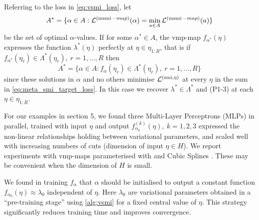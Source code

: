 Referring to the loss in \cref{eq:vsmi_loss}, let
\[
  A^*=\{\alpha\in A: \mathcal{L}^{(\operatorname{\text{msmi}}-map)}(\alpha)=\min_{a\in A} \mathcal{L}^{(\operatorname{\text{msmi}}-map)}(a)\}
\]
be the set of optimal $\alpha$-values.
If for some $\alpha^*\in A$, the \acrshort*{vmp}-map $f_{\alpha^*}(\eta)$ expresses the function $\lambda^*(\eta)$ perfectly at $\eta\in\eta_{1:R}$, that is if $f_{\alpha^*}(\eta_r)\in \Lambda^*(\eta_r),\ r=1,...,R$ then
\[
  A^*=\{\alpha\in A: f_{\alpha}(\eta_r)\in \Lambda^*(\eta_r),\ r=1,...,R\}
\]
since these solutions in $\alpha$ and no others minimise $\mathcal{L}^{(\operatorname{\text{smi}},\eta)}$ at every $\eta$ in the sum in \cref{eq:meta_smi_target_loss}.
In this case we recover $\lambda^*\in \Lambda^*$ and (P1-3) at each $\eta\in \eta_{1:R}$.

For our examples in section 5, we found three Multi-Layer Perceptrons (MLPs) in
parallel, trained with input $\eta$ and output $f^{(k)}_{\alpha_k}(\eta),\ k=1,2,3$ expressed the non-linear
relationships holding between variational parameters, and scaled well with increasing
numbers of cuts (dimension of input $\eta \in H$).
We report experiments with  \acrshort*{vmp}-maps parameterised with  \citep{Rasmussen2005gp} and Cubic Splines \citep{Hastie2001esl}. These may be convenient when the dimension of $H$ is small.

We found in training $f_{\alpha}$ that $\alpha$ should be initialised to output a constant function $f_{\alpha_0}(\eta)\approx\lambda_0$ independent of $\eta$. Here $\lambda_0$ are variational parameters obtained in a ``pre-training stage'' using \cref{alg:vsmi} for a fixed central value of $\eta$.
This strategy significantly reduces training time and improves convergence.

